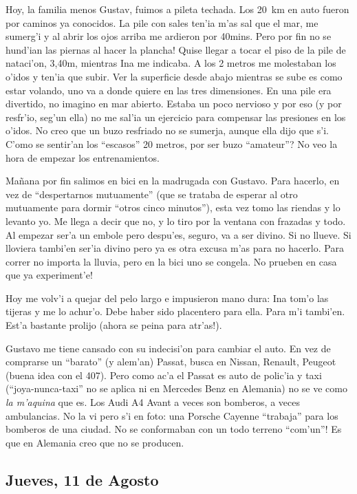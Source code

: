 Hoy, la familia menos Gustav, fuimos a pileta techada. Los 20~km en auto fueron
por caminos ya conocidos. La pile con sales ten'ia m'as sal que el mar, me
sumerg'i y al abrir los ojos arriba me ardieron por 40mins. \textexclamdown Pero
por fin no se hund'ian las piernas al hacer la plancha! Quise llegar a tocar el
piso de la pile de nataci'on, 3,40m, mientras Ina me indicaba. A los 2 metros me
molestaban los o'idos y ten'ia que subir. Ver la superficie desde abajo mientras
se sube es como estar volando, uno va a donde quiere en las tres dimensiones. En
una pile era divertido, no imagino en mar abierto. Estaba un poco nervioso y por
eso (y por resfr'io, seg'un ella) no me sal'ia un ejercicio para compensar las
presiones en los o'idos. No creo que un buzo resfriado no se sumerja, aunque
ella dijo que s'i. \textquestiondown C'omo se sentir'an los ``escasos'' 20
metros, por ser buzo ``amateur''? No veo la hora de empezar los entrenamientos.

Ma\~nana por fin salimos en bici en la madrugada con Gustavo. Para hacerlo, en
vez de ``despertarnos mutuamente'' (que se trataba de esperar al otro mutuamente
para dormir ``otros cinco minutos''), esta vez tomo las riendas y lo levanto yo.
Me llega a decir que no, y lo tiro por la ventana con frazadas y todo. Al
empezar ser'a un embole pero despu'es, seguro, va a ser divino. Si no llueve. Si
lloviera tambi'en ser'ia divino pero ya es otra excusa m'as para no hacerlo.
Para correr no importa la lluvia, pero en la bici uno se congela.
\textexclamdown No prueben en casa que ya experiment'e!

Hoy me volv'i a quejar del pelo largo e impusieron mano dura: Ina tom'o las
tijeras y me lo achur'o. Debe haber sido placentero para ella. Para m'i
tambi'en. Est'a bastante prolijo (\textexclamdown ahora se peina para atr'as!).

Gustavo me tiene cansado con su indecisi'on para cambiar el auto. En vez de
comprarse un ``barato'' (y alem'an) Passat, busca en Nissan, Renault, Peugeot
(buena idea con el 407). Pero como ac'a el Passat es auto de polic'ia y taxi
(``joya-nunca-taxi'' no se aplica ni en Mercedes Benz en Alemania) no se ve como
\emph{la m'aquina} que es. Los Audi A4 Avant a veces son bomberos, a veces
ambulancias. No la vi pero s'i en foto: una Porsche Cayenne ``trabaja'' para los
bomberos de una ciudad. \textexclamdown No se conformaban con un todo terreno
``com'un''! Es que en Alemania creo que no se producen.

\subsection*{Jueves, 11 de Agosto}

